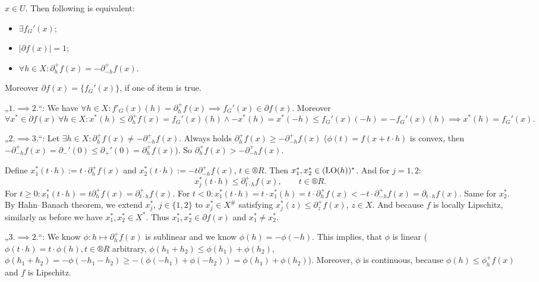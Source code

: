\documentclass[12pt]{article}					%
\begin{document}
\begin{tvrzeni}
	$x \in U$. Then following is equivalent:

	\begin{itemize}
		\item $\exists f_G'(x)$;
		\item $|\partial f(x)| = 1$;
		\item $\forall h \in X: \partial_h^+ f(x) = -\partial_{-h}^+ f(x)$.
	\end{itemize}

	Moreover $\partial f(x) = \{f_G'(x)\}$, if one of item is true.

	\begin{dukazin}
		„$1. \implies 2.$“: We have $\forall h \in X: f'_G(x)(h) = \partial_h^+ f(x) \implies f_G'(x) \in \partial f(x)$. Moreover
		$$ \forall x^* \in \partial f(x)\ \forall h \in X: x^*(h) ≤ \partial_h^+ f(x) = f_G'(x)(h) \land -x^*(h) = x^*(-h) ≤ f_G'(x)(-h) = -f_G'(x)(h) \implies x^*(h) = f_G'(x). $$

		„$2. \implies 3.$“: Let $\exists h \in X: \partial_h^+ f(x) ≠ -\partial_{-h}^+ f(x)$. Always holds $\partial_h^+ f(x) ≥ -\partial_{-h}^+ f(x)$ ($\phi(t) = f(x + t·h)$ is convex, then $-\partial_{-h}^+ f(x) = \partial_-'(0) ≤ \partial_+'(0) = \partial_h^+ f(x)$). So $\partial_h^+ f(x) > -\partial_{-h}^+ f(x)$.

		Define $x_1^*(t·h) := t·\partial_h^+ f(x)$ and $x_2^*(t·h) := - t \partial_{-h}^+ f(x)$, $t \in ®R$. Then $x_1^*, x_2^* \in (\operatorname{LO}(h))^*$. And for $j = 1, 2$:
		$$ x_j^*(t·h) ≤ \partial_{t·h}^+ f(x), \qquad t \in ®R. $$
		For $t ≥ 0: x_1^*(t·h) = t \partial_h^+ f(x) = \partial_{t·h}^+ f(x)$. For $t < 0: x_1^*(t·h) = t·x_1^*(h) = t·\partial_h^+f(x) < -t·\partial_{-h}^+ f(x) = \partial_{t·h} f(x)$. Same for $x_2^*$. By Hahn–Banach theorem, we extend $x_j^*$, $j \in \{1, 2\}$ to $x_j^* \in X^{\#}$ satisfying $x_j^*(z) ≤ \partial_z^+ f(x)$, $z \in X$. And because $f$ is locally Lipschitz, similarly as before we have $x_1^*, x_2^* \in X^*$. Thus $x_1^*, x_2^* \in \partial f(x)$ and $x_1^* ≠ x_2^*$.

		„$3. \implies 2.$“: We know $\phi: h \mapsto \partial_h^+ f(x)$ is sublinear and we know $\phi(h) = -\phi(-h)$. This implies, that $\phi$ is linear ($\phi(t·h) = t·\phi(h), t \in ®R$ arbitrary, $\phi(h_1 + h_2) ≤ \phi(h_1) + \phi(h_2)$, $\phi(h_1 + h_2) = -\phi(-h_1 - h_2) ≥ -(\phi(-h_1) + \phi(-h_2)) = \phi(h_1) + \phi(h_2)$). Moreover, $\phi$ is continuous, because $\phi(h) ≤ \phi_h^+ f(x)$ and $f$ is Lipschitz.
	\end{dukazin}
\end{tvrzeni}
\end{document}

